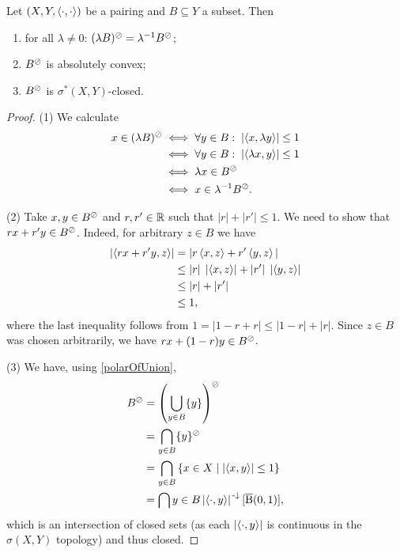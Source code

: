 \begin{lemma} \label{polarPropertiesLemma}
Let $\sSet{X,Y,\pair{\cdot,\cdot}}$ be a pairing and $B\subseteq Y$ a subset. Then
\begin{enumerate}
\item for all $\lambda \neq 0$: $(\lambda B)^{\oslash} = \lambda^{-1}B^{\oslash}$;
\item $B^{\oslash}$ is absolutely convex;
\item $B^{\oslash}$ is $\sigma^*(X,Y)$-closed.
\end{enumerate}
\end{lemma}
\begin{proof}
(1) We calculate
\begin{align*}
x\in (\lambda B)^{\oslash} &\iff \forall y\in B:\; \left|\left\langle x,\lambda y \right\rangle\right| \leq 1 \\
&\iff \forall y\in B:\; \left|\left\langle \lambda x,y \right\rangle\right| \leq 1 \\
&\iff \lambda x\in B^\oslash \\
&\iff x\in \lambda^{-1}B^\oslash.
\end{align*}

(2) Take $x,y\in B^\oslash$ and $r,r'\in \mathbb{R}$ such that $|r| + |r'|\leq 1$. We need to show that $rx + r'y\in B^\oslash$. Indeed, for arbitrary $z\in B$ we have
\begin{align*}
\left|\left\langle rx + r'y, z \right\rangle\right| &= |r\left\langle x,z \right\rangle + r'\left\langle y,z \right\rangle| \\
&\leq |r|\;\left|\left\langle x,z \right\rangle\right| + |r'|\;\left|\left\langle y,z \right\rangle\right| \\
&\leq |r| + |r'| \\
&\leq 1,
\end{align*}
where the last inequality follows from $1 = |1 - r + r| \leq |1-r| + |r|$. Since $z\in B$ was chosen arbitrarily, we have $rx + (1-r)y\in B^\oslash$.

(3) We have, using \ref{polarOfUnion},
\begin{align*}
B^\pol &= \left(\bigcup_{y\in B}\{y\}\right)^\pol \\
&= \bigcap_{y\in B} \{y\}^\pol \\
&= \bigcap_{y\in B}\setbuilder{x\in X}{\abspair{x,y}\leq 1} \\
&= \bigcap{y\in B}\abspair{\cdot, y}^{\preimf}[\cball(0,1)],
\end{align*}
which is an intersection of closed sets (as each $\left|\left\langle \cdot, y \right\rangle\right|$ is continuous in the $\sigma(X,Y)$ topology) and thus closed.
\end{proof}

